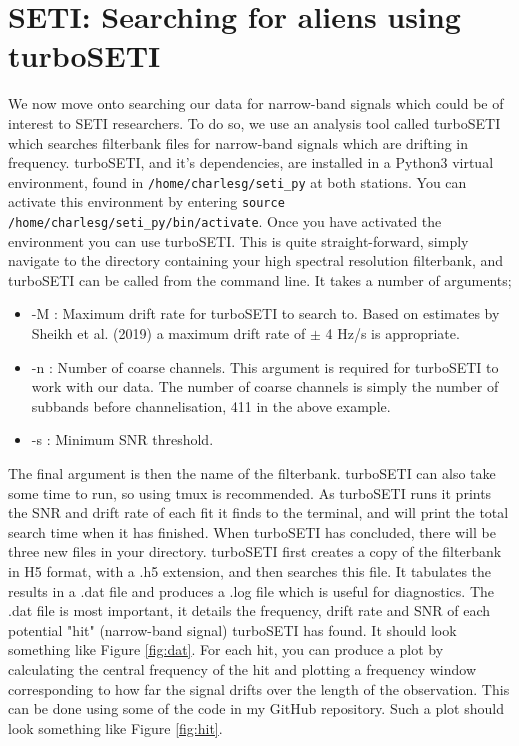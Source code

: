 \documentclass[12pt, onepage]{article}
\numberwithin{equation}{section} %
\begin{document}
\section{SETI: Searching for aliens using turboSETI}
We now move onto searching our data for narrow-band signals which could be of interest to SETI researchers. To do so, we use an analysis tool called turboSETI which searches filterbank files for narrow-band signals which are drifting in frequency. turboSETI, and it's dependencies, are installed in a Python3 virtual environment, found in \texttt{/home/charlesg/seti\_py} at both stations. You can activate this environment by entering \texttt{source /home/charlesg/seti\_py/bin/activate}. Once you have activated the environment you can use turboSETI. This is quite straight-forward, simply navigate to the directory containing your high spectral resolution filterbank, and turboSETI can be called from the command line. It takes a number of arguments;
\begin{itemize}
    \item -M : Maximum drift rate for turboSETI to search to. Based on estimates by Sheikh et al. (2019) a maximum drift rate of $\pm$ 4 Hz/s is appropriate.
    \item -n : Number of coarse channels. This argument is required for turboSETI to work with our data. The number of coarse channels is simply the number of subbands before channelisation, 411 in the above example. 
    \item -s : Minimum SNR threshold. 
\end{itemize}
The final argument is then the name of the filterbank. turboSETI can also take some time to run, so using tmux is recommended. As turboSETI runs it prints the SNR and drift rate of each fit it finds to the terminal, and will print the total search time when it has finished. When turboSETI has concluded, there will be three new files in your directory. turboSETI first creates a copy of the filterbank in H5 format, with a .h5 extension, and then searches this file. It tabulates the results in a .dat file and produces a .log file which is useful for diagnostics. The .dat file is most important, it details the frequency, drift rate and SNR of each potential "hit" (narrow-band signal) turboSETI has found. It should look something like Figure \ref{fig:dat}. For each hit, you can produce a plot by calculating the central frequency of the hit and plotting a frequency window corresponding to how far the signal drifts over the length of the observation. This can be done using some of the code in my GitHub repository. Such a plot should look something like Figure \ref{fig:hit}.
\end{document}
